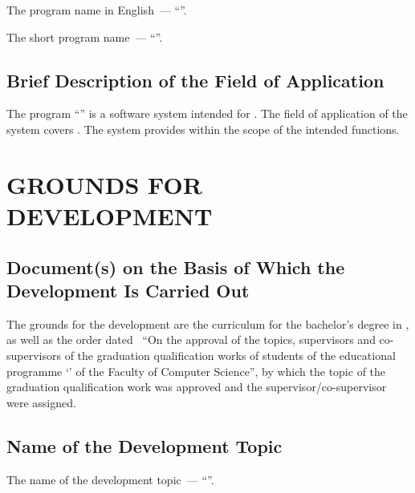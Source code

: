 \documentclass[12pt,a4paper]{extarticle}
\begin{document}
The program name in English~--- \enquote{\hseProjectNameEn}.

The short program name~--- \enquote{\hseProjectNameShort}.

\subsection{Brief Description of the Field of Application}

The program \enquote{\projectname} is a software system intended for . The field of application of the system covers . The system provides  within the scope of the intended functions.

\clearpage

\section{GROUNDS FOR DEVELOPMENT}

\subsection{Document(s) on the Basis of Which the Development Is Carried Out}

The grounds for the development are the curriculum for the bachelor's degree in , as well as the order dated~ \enquote{On the approval of the topics, supervisors and co-supervisors of the graduation qualification works of students of the educational programme \enquote{\hseSpecialization} of the Faculty of Computer Science}, by which the topic of the graduation qualification work was approved and the supervisor/co-supervisor were assigned.

\subsection{Name of the Development Topic}

The name of the development topic~--- \enquote{\projectname}.
\end{document}
